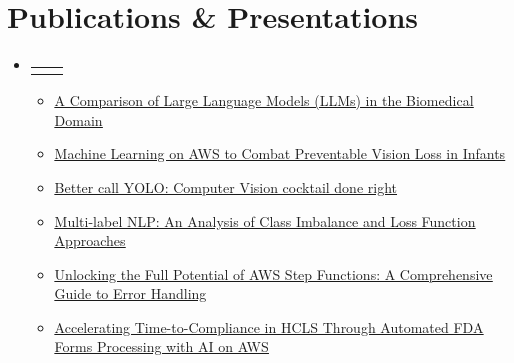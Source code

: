 \documentclass[letterpaper,11pt]{article}
\makeatletter
\newcommand{\resumeItem}[1]{
  \item\small{
    {#1 \vspace{-2pt}}
  }
}
\newcommand{\resumeProjectHeading}[2]{
    \item
    \begin{tabular*}{0.97\textwidth}{l@{\extracolsep{\fill}}r}
      \small#1 & #2 \\
    \end{tabular*}\vspace{-7pt}
}
\newcommand{\resumeSubHeadingListStart}{\begin{itemize}[leftmargin=0.15in, label={}]}
\newcommand{\resumeSubHeadingListEnd}{\end{itemize}}
\newcommand{\resumeItemListStart}{\begin{itemize}}
\newcommand{\resumeItemListEnd}{\end{itemize}\vspace{-5pt}}
\makeatother
\begin{document}
\section{Publications \& Presentations}
\resumeSubHeadingListStart
\resumeProjectHeading
{}{}
\resumeItemListStart
\resumeItem{\href{https://provectus.com/blog/comparison-large-language-models-biomedical-domain/}{\underline{A Comparison of Large Language Models (LLMs) in the Biomedical Domain}}}
\resumeItem{\href{https://aws.amazon.com/blogs/apn/how-pr3vent-uses-machine-learning-on-aws-to-combat-preventable-vision-loss-in-infants/}{\underline{Machine Learning on AWS to Combat Preventable Vision Loss in Infants}}}
\resumeItem{\href{https://www.youtube.com/watch?v=pe8GEUVM4t8}{\underline{Better call YOLO: Computer Vision cocktail done right}}}
\resumeItem{\href{https://www.kdnuggets.com/2023/03/multilabel-nlp-analysis-class-imbalance-loss-function-approaches.html}{\underline{Multi-label NLP: An Analysis of Class Imbalance and Loss Function Approaches}}}
\resumeItem{\href{https://medium.com/provectus-articles/unlocking-the-full-potential-of-aws-step-functions-a-comprehensive-guide-to-error-handling-62f7c425d28c}{\underline{Unlocking the Full Potential of AWS Step Functions: A Comprehensive Guide to Error Handling}}}
\resumeItem{\href{https://aws.amazon.com/blogs/apn/accelerating-time-to-compliance-in-healthcare-and-life-sciences-through-automated-fda-forms-processing-with-ai-on-aws/}{\underline{Accelerating Time-to-Compliance in HCLS Through Automated FDA Forms Processing with AI on AWS}}}
\resumeItemListEnd

\resumeSubHeadingListEnd
%
\end{document}

